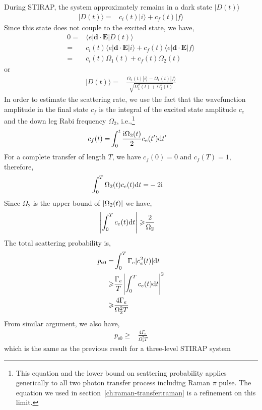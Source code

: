 During STIRAP, the system approximately remains in a dark state $|D(t)\rangle$
\begin{align*}
  |D(t)\rangle=&c_i(t)|i\rangle+c_f(t)|f\rangle
\end{align*}
Since this state does not couple to the excited state, we have,
\begin{align*}
  0=&\langle e|\mathbf{d}\cdot\mathbf{E}|D(t)\rangle\\
  =&c_i(t)\langle e|\mathbf{d}\cdot\mathbf{E}|i\rangle
     +c_f(t)\langle e|\mathbf{d}\cdot\mathbf{E}|f\rangle\\
  =&c_i(t)\Omega_1(t)+c_f(t)\Omega_2(t)
\end{align*}
or
\begin{align*}
  |D(t)\rangle=&\frac{\Omega_2(t)|i\rangle-\Omega_1(t)|f\rangle}{\sqrt{\Omega_1^2(t)+\Omega_2^2(t)}}
\end{align*}
In order to estimate the scattering rate,
we use the fact that the wavefunction amplitude in the final state $c_f$
is the integral of the excited state amplitude $c_e$ and the down leg Rabi frequency $\Omega_2$,
i.e.,\footnote{This equation and the lower bound on scattering probability applies generically
  to all two photon transfer process including Raman $\pi$ pulse.
  The equation we used in section~\ref{ch:raman-transfer:raman} is a refinement
  on this limit.}
\begin{align*}
  c_f(t)=&\int_0^t \frac{\mathrm{i}\Omega_2(t)}{2}c_e(t') \mathrm{d} t'
\end{align*}
For a complete transfer of length $T$, we have $c_f(0)=0$ and $c_f(T)=1$, therefore,
\begin{align*}
  \int_0^T\Omega_2(t)c_e(t)\mathrm{d} t=&-2\mathrm{i}
\end{align*}
Since $\Omega_2$ is the upper bound of ${\left|{\Omega_2(t)}\right|}$ we have,
\begin{align*}
  {\left|{\int_0^Tc_e(t)\mathrm{d}t}\right|}\geqslant&\frac{2}{\Omega_2}
\end{align*}
The total scattering probability is,
\begin{align*}
  p_{\mathrm{s}0}=&\int_0^T \Gamma_e|c_e^2(t)| \mathrm{d} t\\
  \geqslant&\frac{\Gamma_e}{T}{\left|{\int_0^T c_e(t) \mathrm{d} t}\right|}^2\\
  \geqslant&\frac{4\Gamma_e}{\Omega_2^2T}
\end{align*}
From similar argument, we also have,
\begin{align*}
  p_{\mathrm{s}0}\geqslant&\frac{4\Gamma_e}{\Omega_1^2T}
\end{align*}
which is the same as the previous result for a three-level STIRAP system
